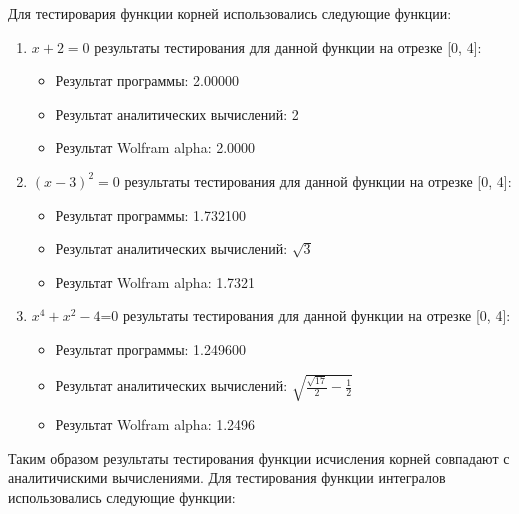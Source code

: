 \documentclass[a4paper,12pt,titlepage,finall]{article}
\begin{document}
\noindent Для тестировария функции корней использовались следующие функции:
\begin{enumerate}
  \item {$x+2=0$} результаты тестирования для данной функции на отрезке [0, 4]:
  \begin{itemize}
    \item Результат программы: 2.00000
    \item Результат аналитических вычислений: 2
    \item Результат Wolfram alpha: 2.0000
  \end{itemize}
  \item {$(x-3)^2=0$} результаты тестирования для данной функции на отрезке [0, 4]:
  \begin{itemize}
    \item Результат программы: 1.732100
    \item Результат аналитических вычислений: {$\sqrt{3}$}
    \item Результат Wolfram alpha: 1.7321
  \end{itemize}
\item {$x^4+x^2-4$=0} результаты тестирования для данной функции на отрезке [0, 4]:
  \begin{itemize}
    \item Результат программы: 1.249600
    \item Результат аналитических вычислений: {$\sqrt{\frac{\sqrt{17}}{2}-\frac{1}{2}}$}
    \item Результат Wolfram alpha: 1.2496
  \end{itemize}
\end{enumerate}
Таким образом результаты тестирования функции исчисления корней совпадают с аналитичискими вычислениями.
\newpage
\noindent Для тестирования функции интегралов использовались следующие функции:
\end{document}
